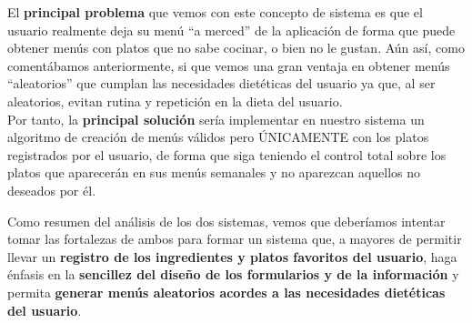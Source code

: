 \documentclass[12pt, a4paper, twoside]{book}
\begin{document}
	El \textbf{principal problema} que vemos con este concepto de sistema es que el usuario realmente deja su menú ``a merced'' de la aplicación de forma que puede obtener menús con platos que no sabe cocinar, o bien no le gustan. Aún así, como comentábamos anteriormente, si que vemos una gran ventaja en obtener menús ``aleatorios'' que cumplan las necesidades dietéticas del usuario ya que, al ser aleatorios, evitan rutina y repetición en la dieta del usuario.\\
	Por tanto, la \textbf{principal solución} sería implementar en nuestro sistema un algoritmo de creación de menús válidos pero ÚNICAMENTE con los platos registrados por el usuario, de forma que siga teniendo el control total sobre los platos que aparecerán en sus menús semanales y no aparezcan aquellos no deseados por él.
	
	Como resumen del análisis de los dos sistemas, vemos que deberíamos intentar tomar las fortalezas de ambos para formar un sistema que, a mayores de permitir llevar un \textbf{registro de los ingredientes y platos favoritos del usuario}, haga énfasis en la \textbf{sencillez del diseño de los formularios y de la información} y permita \textbf{generar menús aleatorios acordes a las necesidades dietéticas del usuario}.
	
\end{document}
